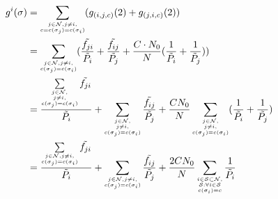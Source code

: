 \begin{equation}
\label{cost1player}
\begin{split}
g^i(\sigma)
& = \sum_{\tiny\substack{j\in \mathcal{N}, j\ne i,\\ c=c(\sigma_j)=c(\sigma_i)}} (g_{(i,j,c)}(2) + g_{(j,i,c)}(2))\\
& = \sum_{\tiny\substack{j\in \mathcal{N}, j\ne i,\\ c(\sigma_j)=c(\sigma_i)}}(\dfrac{\tilde{f_{ji}}}{\tilde{P_i}} + \dfrac{\tilde{f_{ij}}}{\tilde{P_j}}+ \dfrac{C\cdot N_0}{N}(\dfrac{1}{\tilde P_i}+\dfrac{1}{\tilde P_j})) \\
& = \dfrac{\sum\limits_{\tiny\substack{j\in \mathcal{N}, \\j\ne i,\\ c(\sigma_j)=c(\sigma_i)}}\tilde{f_{ji}}}{ \tilde{P_i}} + \sum_{\tiny\substack{j\in \mathcal{N},\\ j\ne i,\\ c(\sigma_j)=c(\sigma_i)}}\dfrac{\tilde{f_{ij}}}{\tilde{P_j}} + \dfrac{CN_0}{N}\sum_{\tiny\substack{j\in \mathcal{N},\\ j\ne i,\\ c(\sigma_j)=c(\sigma_i)}}(\dfrac{1}{\tilde{P_i}}+\dfrac{1}{\tilde{P_j}})\\
& = \dfrac{\sum\limits_{\tiny\substack{j\in \mathcal{N}, j\ne i,\\ c(\sigma_j)=c(\sigma_i)}}\tilde{f_{ji}}}{ \tilde{P_i}} + \sum_{\tiny\substack{j\in \mathcal{N}, j\ne i,\\ c(\sigma_j)=c(\sigma_i)}}\dfrac{\tilde{f_{ij}}}{\tilde{P_j}} + \dfrac{2CN_0}{N}\sum_{\tiny\substack{i\in\mathcal{S}\subset\mathcal{N},\\\mathcal{S}:\forall i\in \mathcal{S}\\ c(\sigma_i)=c}}\dfrac{1}{\tilde{P_i}}\\
\end{split}
\end{equation}

